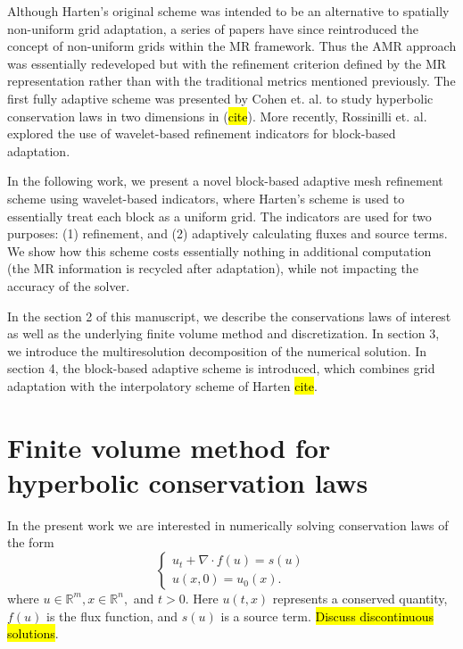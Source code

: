 \documentclass[]{article}
\begin{document}
    Although Harten's original scheme was intended to be an alternative to
    spatially non-uniform grid adaptation, a series of papers have since
    reintroduced the concept of non-uniform grids within the MR framework. Thus
    the AMR approach was essentially redeveloped but with the refinement
    criterion defined by the MR representation rather than with the traditional
    metrics mentioned previously. The first fully adaptive scheme was presented
    by Cohen et. al. to study hyperbolic conservation laws in two dimensions in
    (\hl{cite}). More recently, Rossinilli et. al. explored the use of
    wavelet-based refinement indicators for block-based adaptation.

    In the following work, we present a novel block-based adaptive mesh
    refinement scheme using wavelet-based indicators, where Harten's scheme is
    used to essentially treat each block as a uniform grid.  The indicators are
    used for two purposes: (1) refinement, and (2) adaptively calculating fluxes
    and source terms. We show how this scheme costs essentially nothing in
    additional computation (the MR information is recycled after adaptation),
    while not impacting the accuracy of the solver.

    In the section 2 of this manuscript, we describe the conservations laws
    of interest as well as the underlying finite volume
    method and discretization. In section 3, we introduce the multiresolution
    decomposition of the numerical solution. In section 4, the block-based
    adaptive scheme is introduced, which combines grid adaptation with the
    interpolatory scheme of Harten \hl{cite}.

\section{Finite volume method for hyperbolic conservation laws}

    In the present work we are interested in numerically solving conservation
    laws of the form
    \begin{equation}
    \begin{cases}
      u_{t} + \nabla \cdot f(u) = s(u) \\
      u(x,0) = u_{0}(x).
    \end{cases}
    \label{claw}
    \end{equation}
    where $u \in \mathbb{R}^{m}, x \in \mathbb{R}^{n},$ and $t > 0$. Here
    $u(t,x)$ represents a conserved quantity, $f(u)$ is the flux function, and
    $s(u)$ is a source term. \hl{Discuss discontinuous solutions}.
\end{document}
